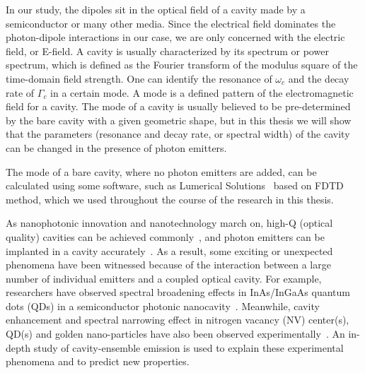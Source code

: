 In our study, the dipoles sit in the optical field of a cavity made by a semiconductor or many other media. Since the electrical field dominates the photon-dipole interactions in our case, we are only concerned with the electric field, or E-field. A cavity is usually characterized by its spectrum or power spectrum, which is defined as the Fourier transform of the modulus square of the time-domain field strength. One can identify the resonance of $\omega_c$ and the decay rate of $\Gamma_c$ in a certain mode. A mode is a defined pattern of the electromagnetic field for a cavity. The mode of a cavity is usually believed to be pre-determined by the bare cavity with a given geometric shape, but in this thesis we will show that the parameters (resonance and decay rate, or spectral width) of the cavity can be changed in the presence of photon emitters.

The mode of a bare cavity, where no photon emitters are added, can be calculated using some software, such as Lumerical Solutions~\cite{LumericalSolutions} based on FDTD method, which we used throughout the course of the research in this thesis.



As nanophotonic innovation and nanotechnology march on, high-Q (optical quality) cavities can be achieved commonly~\cite{Akahane2003, Akahane2005}, and photon emitters can be implanted in a cavity accurately~\cite{Reithmaier2004, Reitzenstein2008}. As a result, some exciting or unexpected phenomena have been witnessed because of the interaction between a large number of individual emitters and a coupled optical cavity. For example, researchers have observed spectral broadening effects in InAs/InGaAs quantum dots (QDs) in a semiconductor photonic nanocavity~\cite{Tawara2008}. Meanwhile, cavity enhancement and spectral narrowing effect in nitrogen vacancy (NV) center(s), QD(s) and golden nano-particles have also been observed experimentally~\cite{Wolters2010, Faraon2011, Reithmaier2004, Englund2005, lodahl2004controlling}. An in-depth study of cavity-ensemble emission is used to explain these experimental phenomena and to predict new properties.


